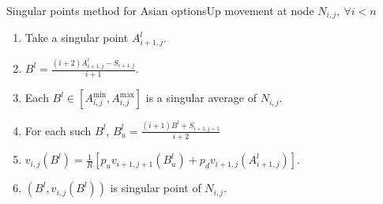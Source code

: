 \documentclass[utf8,t,compress,xcolor=svgnames,handout]{beamer}
\begin{document}
	
	\begin{frame}{Singular points method for Asian options}{Up movement at node $ N_{i,j}, \  \forall i < n $}
		\begin{minipage}[t]{0.6\linewidth}
			\begin{enumerate}
				\item Take a singular point $ A_{i+1,j}^l $.
				\item $ B^l = \frac{ ( i+2) A_{i+1,j}^l - S_{i+1,j} }{ i+1 } $.
				\item Each $ B^l \in \left[ A_{i,j}^{\min}, A_{i,j}^{\max} \right] $ is a singular average of $ N_{i,j} $.
				\item For each such $ B^l $, $ B^l_u = \frac{(i+1) B^l + S_{i+1,j+1}}{i+2} $
				\item $ v_{i,j}( B^l ) = \frac{1}{R} \left[ p_u v_{i+1,j+1} \left( B^l_u \right) + p_d v_{i+1,j} \left( A_{i+1,j}^l \right) \right] $.
				\item $ \left( B^l, v_{i,j}( B^l ) \right) $ is singular point of $ N_{i,j} $.
			\end{enumerate}
		\end{minipage}
		\begin{minipage}[t]{0.3\linewidth}
			\begin{figure}
			\end{figure}
		\end{minipage}
	\end{frame}
	
\end{document}

